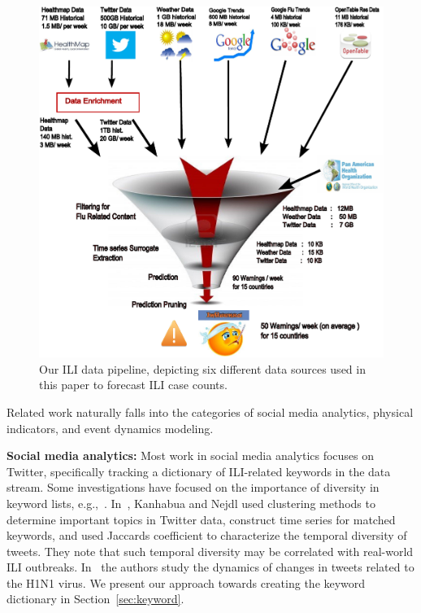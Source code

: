 
\begin{figure}[t] \centering
    \includegraphics[scale=0.3]{fig/ili_data_pipeline.pdf}
    \caption{\label{fig:ili_data_pipeline} Our ILI data pipeline, depicting 
six different data sources used in this paper to forecast ILI case counts.}
 \end{figure}

Related work naturally falls into the categories of social media
analytics, physical indicators, and event dynamics modeling. 
 
\textbf{Social media analytics:}
Most work in social media analytics focuses on Twitter, specifically tracking
a dictionary of ILI-related keywords in the data stream.
Some investigations have focused on the importance of diversity in keyword 
lists, e.g.,~\cite{ref5, ref6}. In~\cite{ref5}, 
Kanhabua and Nejdl used clustering methods to determine
important topics in Twitter data, construct time series for matched keywords,
and used Jaccards coefficient to characterize the temporal
diversity of tweets. They note that such temporal diversity may be
correlated with real-world ILI outbreaks. In~\cite{ref6}
the authors study the dynamics of changes in tweets related to the H1N1 virus. We 
present our approach towards creating the keyword dictionary in Section~\ref{sec:keyword}.

